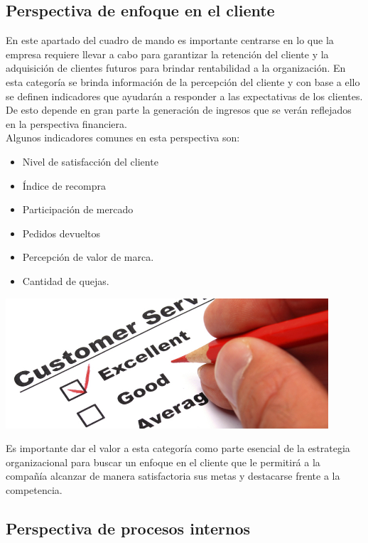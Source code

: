 \pagebreak

\subsection{Perspectiva de enfoque en el cliente}

En este apartado del cuadro de mando es importante centrarse en lo que la empresa requiere llevar a cabo para garantizar la retención del cliente y la adquisición de clientes futuros para brindar rentabilidad a la organización. En esta categoría se brinda información de la percepción del cliente y con base a ello se definen indicadores que ayudarán a responder a las expectativas de los clientes. De esto depende en gran parte la generación de ingresos que se verán reflejados en la perspectiva financiera.\\

Algunos indicadores comunes en esta perspectiva son:
\begin{itemize}
	\item Nivel de satisfacción del cliente
	\item Índice de recompra
	\item Participación de mercado
	\item Pedidos devueltos
	\item Percepción de valor de marca.
	\item Cantidad de quejas.
\end{itemize}

\begin{center}
	\includegraphics[width=12cm]{./Imagenes/imagen3} 
\end{center}
Es importante dar el valor a esta categoría como parte esencial de la estrategia organizacional para buscar un enfoque en el cliente que le permitirá a la compañía alcanzar de manera satisfactoria sus metas y destacarse frente a la competencia.\\
\pagebreak

\subsection{Perspectiva de procesos internos}

